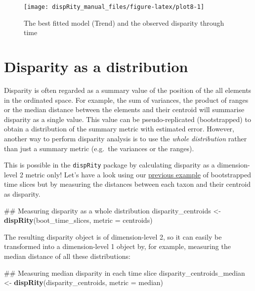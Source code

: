 \documentclass[]{book}
\newenvironment{Shaded}{\begin{snugshade}}{\end{snugshade}}
\newcommand{\KeywordTok}[1]{\textcolor[rgb]{0.13,0.29,0.53}{\textbf{#1}}}
\newcommand{\DataTypeTok}[1]{\textcolor[rgb]{0.13,0.29,0.53}{#1}}
\newcommand{\StringTok}[1]{\textcolor[rgb]{0.31,0.60,0.02}{#1}}
\newcommand{\NormalTok}[1]{#1}
\theoremstyle{definition}
\theoremstyle{definition}
\theoremstyle{definition}
\theoremstyle{remark}
\begin{document}
\begin{figure}

{\centering \texttt{[image: dispRity\_manual\_files/figure-latex/plot8-1]} 

}

\caption{The best fitted model (Trend) and the observed disparity through time}\label{fig:plot8}
\end{figure}

\hypertarget{disparity-as-a-distribution}{\section{Disparity as a
distribution}\label{disparity-as-a-distribution}}

Disparity is often regarded as a summary value of the position of the
all elements in the ordinated space. For example, the sum of variances,
the product of ranges or the median distance between the elements and
their centroid will summarise disparity as a single value. This value
can be pseudo-replicated (bootstrapped) to obtain a distribution of the
summary metric with estimated error. However, another way to perform
disparity analysis is to use the \emph{whole distribution} rather than
just a summary metric (e.g.~the variances or the ranges).

This is possible in the \texttt{dispRity} package by calculating
disparity as a dimension-level 2 metric only! Let's have a look using
our \protect\hyperlink{summarising-dispRity-data-plots}{previous
example} of bootstrapped time slices but by measuring the distances
between each taxon and their centroid as disparity.

\begin{Shaded}
\begin{Highlighting}[]
\NormalTok{## Measuring disparity as a whole distribution}
\NormalTok{disparity_centroids <-}\StringTok{ }\KeywordTok{dispRity}\NormalTok{(boot_time_slices, }\DataTypeTok{metric =}\NormalTok{ centroids)}
\end{Highlighting}
\end{Shaded}

The resulting disparity object is of dimension-level 2, so it can easily
be transformed into a dimension-level 1 object by, for example,
measuring the median distance of all these distributions:

\begin{Shaded}
\begin{Highlighting}[]
\NormalTok{## Measuring median disparity in each time slice}
\NormalTok{disparity_centroids_median <-}\StringTok{ }\KeywordTok{dispRity}\NormalTok{(disparity_centroids, }\DataTypeTok{metric =}\NormalTok{ median)}
\end{Highlighting}
\end{Shaded}
\end{document}
